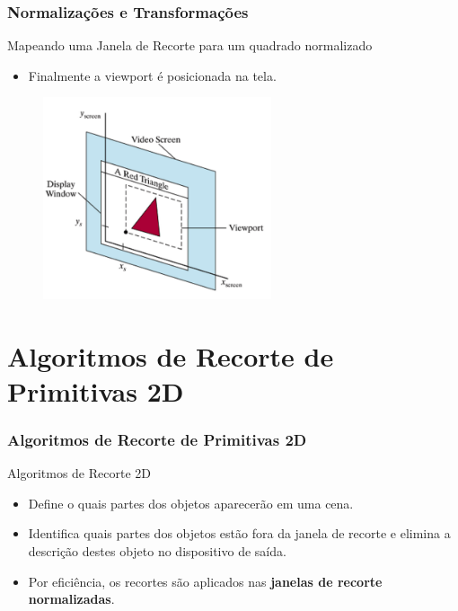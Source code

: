 \documentclass{beamer}
\begin{document}
\begin{frame}
\frametitle{Normalizações e Transformações }

	\begin{block}{Mapeando uma Janela de Recorte para um quadrado normalizado}
		\begin{itemize}
			\item Finalmente a viewport é posicionada na tela.
		\end{itemize}
	\end{block}
	
	\begin{figure}[!h]
			\begin{center}
				\includegraphics[width=0.6\textwidth]{Figures/QuaNorTel}
			\end{center}
	\end{figure}	
\end{frame}


\section{Algoritmos de Recorte de Primitivas 2D}
\begin{frame}
\frametitle{Algoritmos de Recorte de Primitivas 2D}

	\begin{block}{Algoritmos de Recorte 2D}
		\begin{itemize}
			\item Define o quais partes dos objetos aparecerão em uma cena.
			\item Identifica quais partes dos objetos estão fora da janela de recorte e elimina a descrição destes objeto no dispositivo de saída.
			\item Por eficiência, os recortes são aplicados nas \textbf{janelas de recorte normalizadas}.
		\end{itemize}
	\end{block}
\end{frame}
\end{document}

